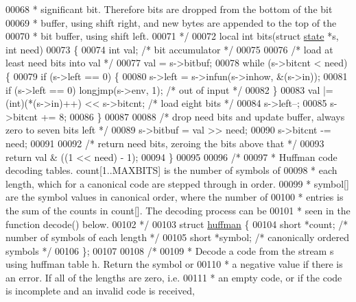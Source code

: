 \begin{DoxyCode}
00068 \textcolor{comment}{ *   significant bit.  Therefore bits are dropped from the bottom of the bit}
00069 \textcolor{comment}{ *   buffer, using shift right, and new bytes are appended to the top of the}
00070 \textcolor{comment}{ *   bit buffer, using shift left.}
00071 \textcolor{comment}{ */}
00072 local \textcolor{keywordtype}{int} bits(\textcolor{keyword}{struct} \hyperlink{structstate}{state} *s, \textcolor{keywordtype}{int} need)
00073 \{
00074     \textcolor{keywordtype}{int} val;            \textcolor{comment}{/* bit accumulator */}
00075 
00076     \textcolor{comment}{/* load at least need bits into val */}
00077     val = s->bitbuf;
00078     \textcolor{keywordflow}{while} (s->bitcnt < need) \{
00079         \textcolor{keywordflow}{if} (s->left == 0) \{
00080             s->left = s->infun(s->inhow, &(s->in));
00081             \textcolor{keywordflow}{if} (s->left == 0) longjmp(s->env, 1);       \textcolor{comment}{/* out of input */}
00082         \}
00083         val |= (int)(*(s->in)++) << s->bitcnt;          \textcolor{comment}{/* load eight bits */}
00084         s->left--;
00085         s->bitcnt += 8;
00086     \}
00087 
00088     \textcolor{comment}{/* drop need bits and update buffer, always zero to seven bits left */}
00089     s->bitbuf = val >> need;
00090     s->bitcnt -= need;
00091 
00092     \textcolor{comment}{/* return need bits, zeroing the bits above that */}
00093     \textcolor{keywordflow}{return} val & ((1 << need) - 1);
00094 \}
00095 
00096 \textcolor{comment}{/*}
00097 \textcolor{comment}{ * Huffman code decoding tables.  count[1..MAXBITS] is the number of symbols of}
00098 \textcolor{comment}{ * each length, which for a canonical code are stepped through in order.}
00099 \textcolor{comment}{ * symbol[] are the symbol values in canonical order, where the number of}
00100 \textcolor{comment}{ * entries is the sum of the counts in count[].  The decoding process can be}
00101 \textcolor{comment}{ * seen in the function decode() below.}
00102 \textcolor{comment}{ */}
00103 \textcolor{keyword}{struct }\hyperlink{structhuffman}{huffman} \{
00104     \textcolor{keywordtype}{short} *count;       \textcolor{comment}{/* number of symbols of each length */}
00105     \textcolor{keywordtype}{short} *symbol;      \textcolor{comment}{/* canonically ordered symbols */}
00106 \};
00107 
00108 \textcolor{comment}{/*}
00109 \textcolor{comment}{ * Decode a code from the stream s using huffman table h.  Return the symbol or}
00110 \textcolor{comment}{ * a negative value if there is an error.  If all of the lengths are zero, i.e.}
00111 \textcolor{comment}{ * an empty code, or if the code is incomplete and an invalid code is received,}

\end{DoxyCode}
